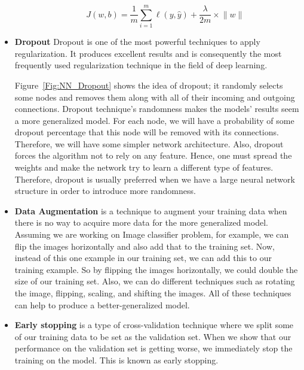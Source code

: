 \begin{itemize}
\begin{enumerate}
\begin{equation}\label{eq:regularization_l1}
J(w,b) = \frac{1}{m} \sum_{i=1}^{m} \ell(y,\widehat{y})+\frac{\lambda}{2m} \times \lVert w \rVert
\end{equation}
   \end{enumerate}
  \item \textbf{Dropout}
Dropout is one of the most powerful techniques to apply regularization. It produces excellent results and is consequently the most frequently used regularization technique in the field of deep learning.

Figure~\ref{Fig:NN_Dropout} shows the idea of dropout; it randomly selects some nodes and removes them along with all of their incoming and outgoing connections. Dropout technique’s randomness makes the models’ results seem a more generalized model. For each node, we will have a probability of some dropout percentage that this node will be removed with its connections. Therefore, we will have some simpler network architecture. Also, dropout forces the algorithm not to rely on any feature. Hence, one must spread the weights and make the network try to learn a different type of features. Therefore, dropout is usually preferred when we have a large neural network structure in order to introduce more randomness.%

\item \textbf{Data Augmentation} is a technique to augment your training data when there is no way to acquire more data for the more generalized model. Assuming we are working on Image classifier problem, for example, we can flip the images horizontally and also add that to the training set. Now, instead of this one example in our training set, we can add this to our training example. So by flipping the images horizontally, we could double the size of our training set. Also, we can do different techniques such as rotating the image, flipping, scaling, and shifting the images. All of these techniques can help to produce a better-generalized model.%

\item \textbf{Early stopping} is a type of cross-validation technique where we split some of our training data to be set as the validation set. When we show that our performance on the validation set is getting worse, we immediately stop the training on the model. This is known as early stopping.%

\end{itemize}

